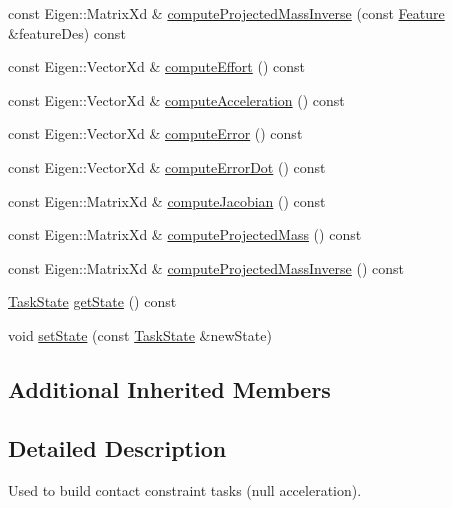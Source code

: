 \begin{DoxyCompactItemize}
\item 
const Eigen\+::\+Matrix\+Xd \& \hyperlink{classocra_1_1ContactConstraintFeature_a92631550ebee4422d2d7305e54be969e}{compute\+Projected\+Mass\+Inverse} (const \hyperlink{classocra_1_1Feature}{Feature} \&feature\+Des) const 
\item 
const Eigen\+::\+Vector\+Xd \& \hyperlink{classocra_1_1ContactConstraintFeature_a02969629d84333788dde6030a0304078}{compute\+Effort} () const 
\item 
const Eigen\+::\+Vector\+Xd \& \hyperlink{classocra_1_1ContactConstraintFeature_a13e55bb956ddc9fea4c37d27fcd9668f}{compute\+Acceleration} () const 
\item 
const Eigen\+::\+Vector\+Xd \& \hyperlink{classocra_1_1ContactConstraintFeature_a1b105bfb82721debb1cb2e3a32b2c31f}{compute\+Error} () const 
\item 
const Eigen\+::\+Vector\+Xd \& \hyperlink{classocra_1_1ContactConstraintFeature_a2be18c3f6ca27b19a1507f8d611d4126}{compute\+Error\+Dot} () const 
\item 
const Eigen\+::\+Matrix\+Xd \& \hyperlink{classocra_1_1ContactConstraintFeature_a16f78f2cc10589c05206f0ce0d405603}{compute\+Jacobian} () const 
\item 
const Eigen\+::\+Matrix\+Xd \& \hyperlink{classocra_1_1ContactConstraintFeature_ab60136af1f6bc58ae27d3f410f1d6164}{compute\+Projected\+Mass} () const 
\item 
const Eigen\+::\+Matrix\+Xd \& \hyperlink{classocra_1_1ContactConstraintFeature_a6c2e8b832b433f89716a5d5bcc1f4640}{compute\+Projected\+Mass\+Inverse} () const 
\item 
\hyperlink{classocra_1_1TaskState}{Task\+State} \hyperlink{classocra_1_1ContactConstraintFeature_afebdd981bf9dbe327e7f53294aa1dd97}{get\+State} () const 
\item 
void \hyperlink{classocra_1_1ContactConstraintFeature_a1bbc7ca568a64aed7704118b8eeaf6d1}{set\+State} (const \hyperlink{classocra_1_1TaskState}{Task\+State} \&new\+State)
\end{DoxyCompactItemize}
\subsection*{Additional Inherited Members}


\subsection{Detailed Description}
Used to build contact constraint tasks (null acceleration). 

